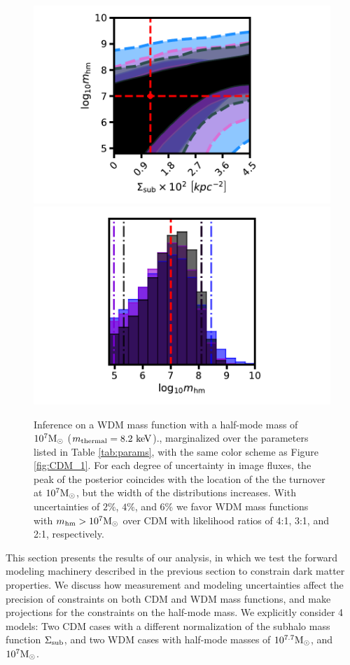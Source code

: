 \begin{figure}
	\includegraphics[clip,trim=2cm 0cm 3.5cm
	0.25cm,width=.48\textwidth,keepaspectratio]{./figures_LOSforward/WDM_246_7_joint.pdf}
	\includegraphics[clip,trim=2cm 0cm 3.5cm
	0.5cm,width=.48\textwidth,keepaspectratio]{./figures_LOSforward/WDM_246_7_mhm.pdf}
	\caption[Joint posterior distribution of the normalization of the SHMF and the half-mode mass from WDM mock data (2)]{\label{fig:WDM_2} Inference on a WDM mass function with a half-mode mass of $10^{7} {\rm{M}_{\odot}}$ ($m_{\rm{thermal}} = 8.2 \ \rm{keV}$)., marginalized over the parameters listed in Table \ref{tab:params}, with the same color scheme as Figure \ref{fig:CDM_1}. For each degree of uncertainty in image fluxes, the peak of the posterior coincides with the location of the the turnover at $10^{7}{\rm{M}_{\odot}}$, but the width of the distributions increases. With uncertainties of $2\%$, $4\%$, and $6\%$ we favor WDM mass functions with ${m_{\rm{hm}}} > 10^{7} {\rm{M}_{\odot}}$ over CDM with likelihood ratios of 4:1, 3:1, and 2:1, respectively.}
\end{figure}	
This section presents the results of our analysis, in which we test the forward modeling machinery described in the previous section to constrain dark matter properties. We discuss how measurement and modeling uncertainties affect the precision of constraints on both CDM and WDM mass functions, and make projections for the constraints on the half-mode mass. We explicitly consider 4 models: Two CDM cases with a different normalization of the subhalo mass function $\Sigma_{\rm{sub}}$, and two WDM cases with half-mode masses of $10^{7.7} {\rm{M}_{\odot}}$, and $10^{7} {\rm{M}_{\odot}}$. 

